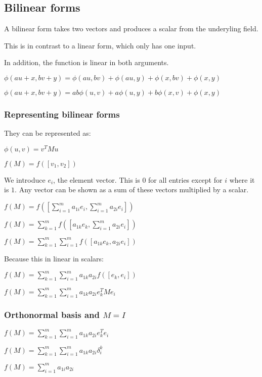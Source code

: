 
\subsection{Bilinear forms}

A bilinear form takes two vectors and produces a scalar from the underyling field.

This is in contrast to a linear form, which only has one input.

In addition, the function is linear in both arguments.

\(\phi (au+x, bv+y)=\phi (au,bv)+\phi (au,y)+\phi (x,bv)+\phi (x,y)\)

\(\phi (au+x, bv+y)=ab\phi (u,v)+a\phi (u,y)+b\phi (x,v)+\phi (x,y)\)

\subsubsection{Representing bilinear forms}

They can be represented as:

\(\phi (u,v)=v^TMu\)

$f(M)=f([v_1,v_2])$

We introduce \(e_i\), the element vector. This is \(0\) for all entries except for \(i\) where it is \(1\). Any vector can be shown as a sum of these vectors multiplied by a scalar.

$f(M)=f([\sum^m_{i=1}a_{1i}e_i,\sum^m_{i=1}a_{2i}e_i])$

$f(M)=\sum_{k=1}^mf([a_{1k}e_k,\sum^m_{i=1}a_{2i}e_i])$

$f(M)=\sum_{k=1}^m\sum^m_{i=1}f([a_{1k}e_k,a_{2i}e_i])$

Because this in linear in scalars:

$f(M)=\sum_{k=1}^m\sum^m_{i=1}a_{1k}a_{2i}f([e_k,e_i])$

$f(M)=\sum_{k=1}^m\sum^m_{i=1}a_{1k}a_{2i}e_k^TMe_i$

\subsubsection{Orthonormal basis and \(M=I\)}

$f(M)=\sum_{k=1}^m\sum^m_{i=1}a_{1k}a_{2i}e_k^Te_i$

$f(M)=\sum_{k=1}^m\sum^m_{i=1}a_{1k}a_{2i}\delta_i^k$

$f(M)=\sum^m_{i=1}a_{1i}a_{2i}$


